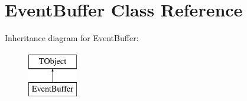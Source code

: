 \hypertarget{class_event_buffer}{}\section{Event\+Buffer Class Reference}
\label{class_event_buffer}
Inheritance diagram for Event\+Buffer\+:\begin{figure}[H]
\begin{center}
\leavevmode
\includegraphics[height=2.000000cm]{class_event_buffer}
\end{center}
\end{figure}
